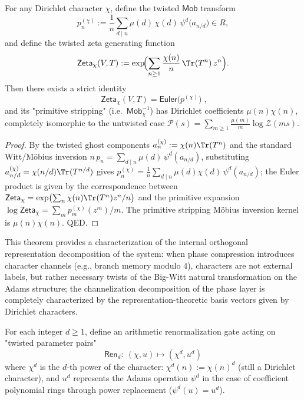 \begin{theorem}\label{thm:witt-dirichlet-twist}
For any Dirichlet character \(\chi\), define the twisted \(\mathsf{Mob}\) transform
\[
p_n^{(\chi)}:=\frac{1}{n}\sum_{d\mid n}\mu(d)\,\chi(d)\,\psi^d\!\bigl(a_{n/d}\bigr)\in R,
\]
and define the twisted zeta generating function
\[
\mathsf{Zeta}_{\chi}(V,T)
:=\exp\!\Bigl(\sum_{n\ge 1}\frac{\chi(n)}{n}\,\Tr(T^{n})\,z^{n}\Bigr).
\]
Then there exists a strict identity
\[
\boxed{\;\mathsf{Zeta}_{\chi}(V,T)=\mathsf{Euler}\bigl(p^{(\chi)}\bigr)\; },
\]
and its "primitive stripping" (i.e.\ \(\mathsf{Mob}_{\chi}^{-1}\)) has Dirichlet coefficients \(\mu(n)\chi(n)\), completely isomorphic to the untwisted case \(\mathcal{P}(s)=\sum_{m\ge 1}\frac{\mu(m)}{m}\log\mathcal{Z}(ms)\).
\end{theorem}
\begin{proof}
By the twisted ghost components \(a_n^{(\chi)}:=\chi(n)\Tr(T^n)\) and the standard Witt/Möbius inversion \(n\,p_n=\sum_{d\mid n}\mu(d)\,\psi^d(a_{n/d})\), substituting \(a_{n/d}^{(\chi)}=\chi(n/d)\Tr(T^{n/d})\) gives \(p_n^{(\chi)}=\frac{1}{n}\sum_{d\mid n}\mu(d)\chi(d)\,\psi^d(a_{n/d})\); the Euler product is given by the correspondence between \(\mathsf{Zeta}_{\chi}=\exp\bigl(\sum_n \chi(n)\Tr(T^n)z^n/n\bigr)\) and the primitive expansion \(\log\mathsf{Zeta}_{\chi}=\sum_m p_m^{(\chi)}(z^m)/m\). The primitive stripping Möbius inversion kernel is \(\mu(n)\chi(n)\). QED.
\end{proof}
This theorem provides a characterization of the internal orthogonal representation decomposition of the system: when phase compression introduces character channels (e.g., branch memory modulo \(4\)), characters are not external labels, but rather necessary twists of the Big-Witt natural transformation on the Adams structure; the channelization decomposition of the phase layer is completely characterized by the representation-theoretic basis vectors given by Dirichlet characters.

\begin{definition}\label{def:witt-adams-dirichlet-renorm-gate}
For each integer \(d\ge 1\), define an arithmetic renormalization gate acting on "twisted parameter pairs"
\begin{equation}\label{eq:witt-adams-dirichlet-renorm-gate}
\boxed{\;
\mathsf{Ren}_d:\ (\chi,u)\longmapsto(\chi^d,u^d)\;}
\end{equation}
where \(\chi^d\) is the \(d\)-th power of the character: \(\chi^d(n):=\chi(n)^d\) (still a Dirichlet character), and \(u^d\) represents the Adams operation \(\psi^d\) in the case of coefficient polynomial rings through power replacement (\(\psi^d(u)=u^d\)).
\end{definition}

